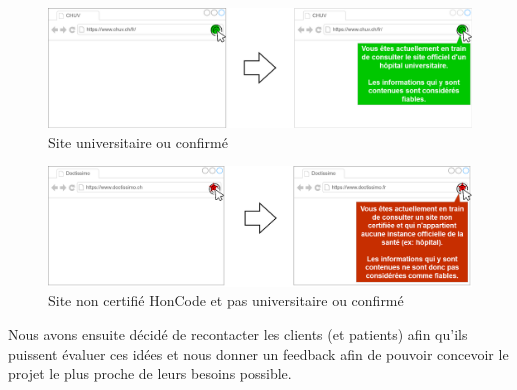 \documentclass{ReportTemplate}
\begin{document}
\begin{figure}[H]
    \centering
    \includegraphics[width=\textwidth]{imageSources/Exemple_Extension_3.png}
    \caption{Site universitaire ou confirmé}
    \label{fig:ExempleExt3}
\end{figure}
\begin{figure}[H]
    \centering
    \includegraphics[width=\textwidth]{imageSources/Exemple_Extension_4.png}
    \caption{Site non certifié HonCode et pas universitaire ou confirmé}
    \label{fig:ExempleExt4}
\end{figure}

Nous avons ensuite décidé de recontacter les clients (et patients) afin qu'ils
puissent évaluer ces idées et nous donner un feedback afin de pouvoir concevoir
le projet le plus proche de leurs besoins possible.
\end{document}
